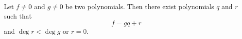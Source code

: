 Let $f \neq 0$ and $g \neq 0$ be two polynomials. Then there exist polynomials $q$ and $r$ such that
$$f = gq + r$$
and $\deg r < \deg g$ or $r = 0$.
